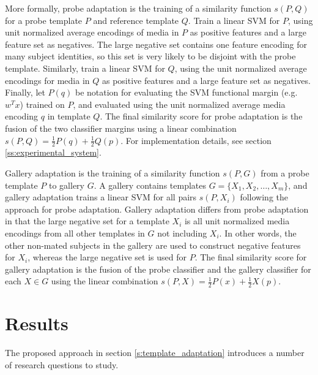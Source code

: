 \documentclass[10pt,twocolumn,letterpaper]{article}
\theoremstyle{definition}		\newtheorem{defn}[thm]{Definition}
\begin{document}
More formally, probe adaptation is the training of a similarity function $s(P,Q)$ for a probe template $P$ and reference template $Q$.  Train a linear SVM for $P$, using unit normalized average encodings of media in $P$ as positive features and a large feature set as negatives. The large negative set contains one feature encoding for many subject identities, so this set is very likely to be disjoint with the probe template. 
Similarly, train a linear SVM for $Q$, using the unit normalized average encodings for media in $Q$ as positive features and a large feature set as negatives.  Finally, let $P(q)$ be notation for evaluating the SVM functional margin (e.g. $w^Tx$) trained on $P$, and evaluated using the unit normalized average media encoding $q$ in template $Q$.  The final similarity score for probe adaptation is the fusion of the two classifier margins using a linear combination $s(P,Q) = \frac{1}{2}P(q) + \frac{1}{2}Q(p)$.  For implementation details, see section \ref{ss:experimental_system}.

Gallery adaptation is the training of a similarity function $s(P,G)$ from a probe template $P$ to gallery $G$.  A gallery contains templates $G=\{X_1,X_2,\ldots,X_m\}$, and gallery adaptation trains a linear SVM for all pairs $s(P,X_i)$ following the approach for probe adaptation.  Gallery adaptation differs from probe adaptation in that the large negative set for a template $X_i$ is all unit normalized media encodings from all other templates in $G$ not including $X_i$.  In other words, the other non-mated subjects in the gallery are used to construct negative features for $X_i$, whereas the large negative set is used for $P$.  The final similarity score for gallery adaptation is the fusion of the probe classifier and the gallery classifier for each $X \in G$ using the linear combination $s(P,X) = \frac{1}{2}P(x) + \frac{1}{2}X(p)$.


















\section{Results}
\label{s:results}


The proposed approach in section \ref{s:template_adaptation} introduces a number of research questions to study.  
\medskip
\end{document}

